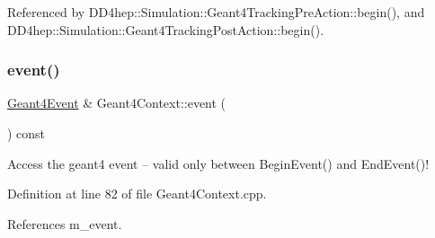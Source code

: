 Referenced by D\+D4hep\+::\+Simulation\+::\+Geant4\+Tracking\+Pre\+Action\+::begin(), and D\+D4hep\+::\+Simulation\+::\+Geant4\+Tracking\+Post\+Action\+::begin().

\hypertarget{class_d_d4hep_1_1_simulation_1_1_geant4_context_a47f2c31d7ddd7a9890c6a58e19a32b99}{}\label{class_d_d4hep_1_1_simulation_1_1_geant4_context_a47f2c31d7ddd7a9890c6a58e19a32b99} 
\subsubsection{\texorpdfstring{event()}{event()}}
{\footnotesize\ttfamily \hyperlink{class_d_d4hep_1_1_simulation_1_1_geant4_event}{Geant4\+Event} \& Geant4\+Context\+::event (\begin{DoxyParamCaption}{ }\end{DoxyParamCaption}) const}



Access the geant4 event -- valid only between Begin\+Event() and End\+Event()! 



Definition at line 82 of file Geant4\+Context.\+cpp.



References m\+\_\+event.




